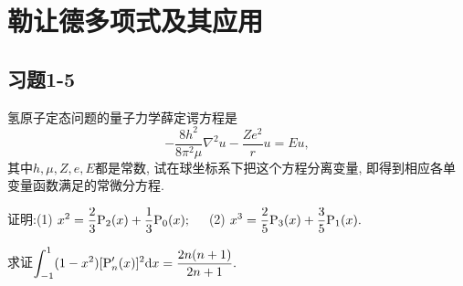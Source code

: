

\chapter{勒让德多项式及其应用}

\section{习题1-5}

\begin{yyEx}
	氢原子定态问题的量子力学薛定谔方程是\begin{equation*}
		-\frac{8h^2}{8\pi^2\mu}\nabla^2u-\frac{Ze^2}{r}u = Eu,
	\end{equation*}
	其中$h,\mu,Z,e,E$都是常数, 试在球坐标系下把这个方程分离变量, 即得到相应各单变量函数满足的常微分方程.
\end{yyEx}

\begin{yyEx}
	证明:(1) $\begin{lgathered}
			x^2 = \frac{2}{3}\mathrm{P}_2(x) + \frac{1}{3}\mathrm{P}_0(x);
		\end{lgathered}$~~~(2)
		$\begin{lgathered}
			x^3 = \frac{2}{5}\mathrm{P}_3(x) + \frac{3}{5}\mathrm{P}_1(x).
		\end{lgathered}$
\end{yyEx}

\begin{yyEx}
	求证$\begin{lgathered}
		\int_{-1}^{1}(1-x^2)[\mathrm{P}_n'(x)]^2\mathrm{d}x = \frac{2n(n+1)}{2n+1}.
	\end{lgathered}$
\end{yyEx}

